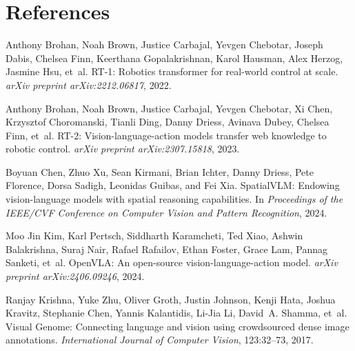 \documentclass{article}
\begin{document}
\section*{References}
\small
\begin{thebibliography}{}

Anthony Brohan, Noah Brown, Justice Carbajal, Yevgen Chebotar, Joseph Dabis, Chelsea Finn, Keerthana Gopalakrishnan, Karol Hausman, Alex Herzog, Jasmine Hsu, et~al.
\newblock RT-1: Robotics transformer for real-world control at scale.
\newblock \emph{arXiv preprint arXiv:2212.06817}, 2022.

Anthony Brohan, Noah Brown, Justice Carbajal, Yevgen Chebotar, Xi Chen, Krzysztof Choromanski, Tianli Ding, Danny Driess, Avinava Dubey, Chelsea Finn, et~al.
\newblock RT-2: Vision-language-action models transfer web knowledge to robotic control.
\newblock \emph{arXiv preprint arXiv:2307.15818}, 2023.

Boyuan Chen, Zhuo Xu, Sean Kirmani, Brian Ichter, Danny Driess, Pete Florence, Dorsa Sadigh, Leonidas Guibas, and Fei Xia.
\newblock SpatialVLM: Endowing vision-language models with spatial reasoning capabilities.
\newblock In \emph{Proceedings of the IEEE/CVF Conference on Computer Vision and Pattern Recognition}, 2024.

Moo Jin Kim, Karl Pertsch, Siddharth Karamcheti, Ted Xiao, Ashwin Balakrishna, Suraj Nair, Rafael Rafailov, Ethan Foster, Grace Lam, Pannag Sanketi, et~al.
\newblock OpenVLA: An open-source vision-language-action model.
\newblock \emph{arXiv preprint arXiv:2406.09246}, 2024.

Ranjay Krishna, Yuke Zhu, Oliver Groth, Justin Johnson, Kenji Hata, Joshua Kravitz, Stephanie Chen, Yannis Kalantidis, Li-Jia Li, David~A. Shamma, et~al.
\newblock Visual Genome: Connecting language and vision using crowdsourced dense image annotations.
\newblock \emph{International Journal of Computer Vision}, 123:32--73, 2017.


\end{thebibliography}
\end{document}
